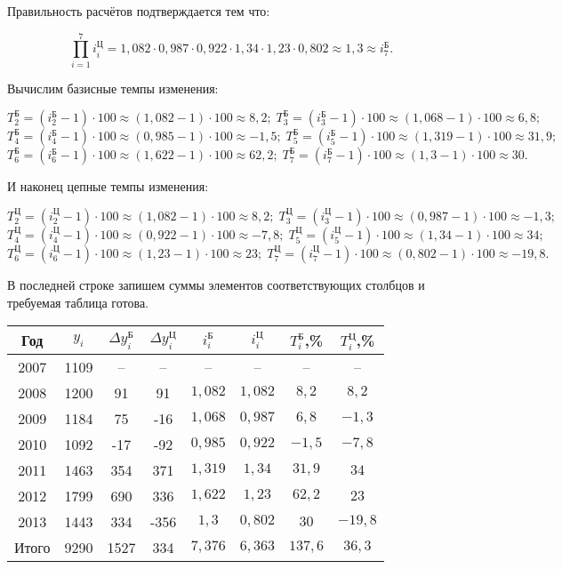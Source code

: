 \documentclass[fleqn]{article}
\begin{document}
Правильность расчётов подтверждается тем что:

$$\prod_{i=1}^7i_i^\textit{Ц}=1,082\cdot0,987\cdot0,922\cdot1,34\cdot1,23\cdot0,802\approx1,3\approx i_7^\textit{Б}.$$

Вычислим базисные темпы изменения:

$$T_2^\textit{Б}=(i_2^\textit{Б}-1)\cdot100\approx(1,082-1)\cdot100\approx8,2;\;T_3^\textit{Б}=(i_3^\textit{Б}-1)\cdot100\approx(1,068-1)\cdot100\approx6,8;$$
$$T_4^\textit{Б}=(i_4^\textit{Б}-1)\cdot100\approx(0,985-1)\cdot100\approx-1,5;\;T_5^\textit{Б}=(i_5^\textit{Б}-1)\cdot100\approx(1,319-1)\cdot100\approx31,9;$$
$$T_6^\textit{Б}=(i_6^\textit{Б}-1)\cdot100\approx(1,622-1)\cdot100\approx62,2;\;T_7^\textit{Б}=(i_7^\textit{Б}-1)\cdot100\approx(1,3-1)\cdot100\approx30.$$

И наконец цепные темпы изменения:

$$T_2^\textit{Ц}=(i_2^\textit{Ц}-1)\cdot100\approx(1,082-1)\cdot100\approx8,2;\;T_3^\textit{Ц}=(i_3^\textit{Ц}-1)\cdot100\approx(0,987-1)\cdot100\approx-1,3;$$
$$T_4^\textit{Ц}=(i_4^\textit{Ц}-1)\cdot100\approx(0,922-1)\cdot100\approx-7,8;\;T_5^\textit{Ц}=(i_5^\textit{Ц}-1)\cdot100\approx(1,34-1)\cdot100\approx34;$$
$$T_6^\textit{Ц}=(i_6^\textit{Ц}-1)\cdot100\approx(1,23-1)\cdot100\approx23;\;T_7^\textit{Ц}=(i_7^\textit{Ц}-1)\cdot100\approx(0,802-1)\cdot100\approx-19,8.$$

В последней строке запишем суммы элементов соответствующих столбцов и требуемая таблица готова.

\bgroup
\def\arraystretch{1.8}
\setlength{}
\begin{center}
\begin{tabular}{|c|c|c|c|c|c|c|c|}
\hline
Год & $y_i$ & $\Delta y_i^\textit{Б}$ & $\Delta y_i^\textit{Ц}$ & $i_i^\textit{Б}$ & $i_i^\textit{Ц}$ & $T_i^\textit{Б}$,\% & $T_i^\textit{Ц}$,\% \\
\hline
2007 & 1109 & -- & -- & -- & -- & -- & -- \\
\hline
2008 & 1200 & 91 & 91 & $1,082$ & $1,082$ & $8,2$ & $8,2$ \\
\hline
2009 & 1184 & 75 & -16 & $1,068$ & $0,987$ & $6,8$ & $-1,3$ \\
\hline
2010 & 1092 & -17 & -92 & $0,985$ & $0,922$ & $-1,5$ & $-7,8$ \\
\hline
2011 & 1463 & 354 & 371 & $1,319$ & $1,34$ & $31,9$ & $34$ \\
\hline
2012 & 1799 & 690 & 336 & $1,622$ & $1,23$ & $62,2$ & $23$ \\
\hline
2013 & 1443 & 334 & -356 & $1,3$ & $0,802$ & $30$ & $-19,8$ \\
\hline
Итого & 9290 & 1527 & 334 & $7,376$ & $6,363$ & $137,6$ & $36,3$ \\
\hline
\end{tabular}
\end{center}
\egroup
\end{document}
